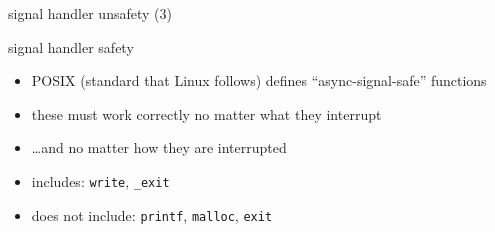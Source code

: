 \begin{frame}{signal handler unsafety (3)}

\end{frame}

\begin{frame}{signal handler safety}
\begin{itemize}
\item POSIX (standard that Linux follows) defines ``async-signal-safe'' functions
\item these must work correctly no matter what they interrupt
\item \ldots and no matter how they are interrupted
\item includes: {\tt write}, {\tt \_exit}
\item does not include: {\tt printf}, {\tt malloc}, {\tt exit}
\end{itemize}
\end{frame}


